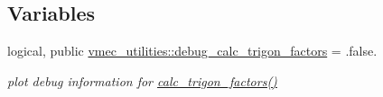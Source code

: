 \subsection*{Variables}
\begin{DoxyCompactItemize}
\item 
logical, public \hyperlink{namespacevmec__utilities_abeb2bf5595170bdf2dd07a6f2bfa89ff}{vmec\+\_\+utilities\+::debug\+\_\+calc\+\_\+trigon\+\_\+factors} = .false.
\begin{DoxyCompactList}\small\item\em plot debug information for \hyperlink{namespacevmec__utilities_ac699116fc25fdea3e28e488513d97c87}{calc\+\_\+trigon\+\_\+factors()} \end{DoxyCompactList}\end{DoxyCompactItemize}
